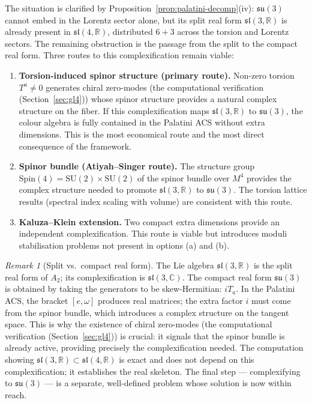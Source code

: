 \documentclass[11pt,a4paper]{article}
\theoremstyle{plain}
\theoremstyle{definition}
\theoremstyle{remark}
\newtheorem{remark}[theorem]{Remark}
\begin{document}
\noindent The situation is clarified by Proposition~\ref{prop:palatini-decomp}(iv):
$\mathfrak{su}(3)$ cannot embed in the Lorentz sector alone, but its split
real form $\mathfrak{sl}(3,\mathbb{R})$ is already present in $\mathfrak{sl}(4,\mathbb{R})$,
distributed $6+3$ across the torsion and Lorentz sectors.  The remaining
obstruction is the passage from the split to the compact real form.
Three routes to this complexification remain viable:

\begin{enumerate}[label=(\alph*)]
  \item \textbf{Torsion-induced spinor structure (primary route).}
    Non-zero torsion $T^a \neq 0$ generates chiral zero-modes
    (the computational verification (Section~\ref{sec:gl4})) whose spinor structure provides a natural
    complex structure on the fiber.  If this complexification maps
    $\mathfrak{sl}(3,\mathbb{R})$ to $\mathfrak{su}(3)$, the colour
    algebra is fully contained in the Palatini ACS without extra dimensions.
    This is the most economical route and the most direct
    consequence of the framework.

  \item \textbf{Spinor bundle (Atiyah--Singer route).}
    The structure group $\mathrm{Spin}(4) = \mathrm{SU}(2) \times \mathrm{SU}(2)$
    of the spinor bundle over $M^4$ provides the complex structure
    needed to promote $\mathfrak{sl}(3,\mathbb{R})$ to $\mathfrak{su}(3)$.
    The torsion lattice results (spectral index scaling with volume)
    are consistent with this route.

  \item \textbf{Kaluza--Klein extension.}
    Two compact extra dimensions provide an independent complexification.
    This route is viable but introduces moduli stabilisation problems
    not present in options (a) and (b).
\end{enumerate}

\begin{remark}[Split vs.\ compact real form]\label{rem:split-compact}
The Lie algebra $\mathfrak{sl}(3,\mathbb{R})$ is the split real form of $A_2$;
its complexification is $\mathfrak{sl}(3,\mathbb{C})$.
The compact real form $\mathfrak{su}(3)$ is obtained by taking the generators
to be skew-Hermitian: $iT_a$.  In the Palatini ACS, the bracket $[e,\omega]$
produces real matrices; the extra factor $i$ must come from the spinor bundle,
which introduces a complex structure on the tangent space.  This is why
the existence of chiral zero-modes (the computational verification (Section~\ref{sec:gl4})) is crucial:
it signals that the spinor bundle is already active, providing precisely
the complexification needed.  The computation showing
$\mathfrak{sl}(3,\mathbb{R}) \subset \mathfrak{sl}(4,\mathbb{R})$ is exact
and does not depend on this complexification; it establishes the real skeleton.
The final step --- complexifying to $\mathfrak{su}(3)$ --- is a separate,
well-defined problem whose solution is now within reach.
\end{remark}
\end{document}
